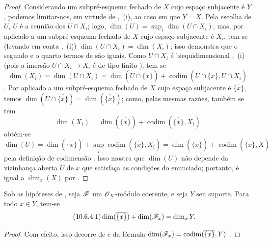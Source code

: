 \begin{proof}
Considerando um subpré-esquema fechado de $X$ cujo espaço subjacente é $Y$, podemos limitar-nos, em virtude de ,~(i), ao caso em que $Y=X$.
Pela escolha de $U$, $U$ é a reunião dos $U\cap X_i$; logo, $\dim(U)=\sup_i\dim(U\cap X_i)$; mas, por  aplicado a um subpré-esquema fechado de $X$ cujo espaço subjacente é $X_i$, tem-se (levando em conta ,~(i)) $\dim(U\cap X_i)=\dim(X_i)$; isso demonstra que o segundo e o quarto termos de  são iguais.
Como $U\cap X_i$ é biequidimensional ,~(i) (pois a imersão $U\cap X_i\to X_i$ é de tipo finito ), tem-se
\begin{equation}
\label{IV.10.6.3.2}
\tag{10.6.3.2}
\dim(X_i)=\dim(U\cap X_i)=\dim(U\cap\overline{\{x\}})
 +\operatorname{codim}(U\cap\overline{\{x\}},U\cap X_i)
\end{equation}
.
Por  aplicado a um subpré-esquema fechado de $X$ cujo espaço subjacente é $\overline{\{x\}}$, temos $\dim(U\cap\overline{\{x\}})=\dim(\overline{\{x\}})$; como, pelas mesmas razões, também se tem
\begin{equation}
\label{IV.10.6.3.3}
\tag{10.6.3.3}
\dim(X_i)=\dim(\overline{\{x\}})
 +\operatorname{codim}(\overline{\{x\}},X_i)
\end{equation}
obtém-se
\[
  \dim(U)=\dim(\overline{\{x\}})
  +\sup_i\operatorname{codim}(\overline{\{x\}},X_i)
  =\dim(\overline{\{x\}})+\operatorname{codim}(\overline{\{x\}},X)
\]
pela definição de codimensão .
Isso mostra que $\dim(U)$ não depende da vizinhança aberta $U$ de $x$ que satisfaça as condições do enunciado; portanto, é igual a $\dim_x(X)$ por .
\end{proof}

\begin{corollary}[10.6.4]
\label{IV.10.6.4}
Sob as hipóteses de , seja $\mathscr{F}$ um $\mathscr{O}_X$-módulo coerente, e seja $Y$ seu suporte.
Para todo $x\in Y$, tem-se
\begin{equation}
\label{IV.10.6.4.1}
\tag{10.6.4.1}
\dim(\overline{\{x\}})+\dim(\sh{F}_x)=\dim_x Y.
\end{equation}
\end{corollary}

\begin{proof}
Com efeito, isso decorre de  e da fórmula $\dim(\mathscr{F}_x)=\operatorname{codim}(\overline{\{x\}},Y)$ .
\end{proof}

